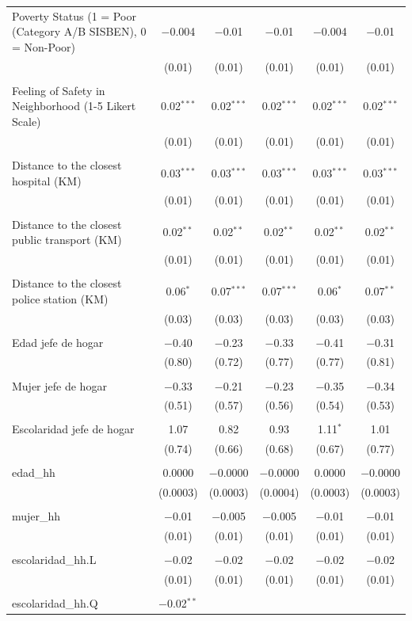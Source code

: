 \begin{table}[H]
\begin{tabularx}{0.9\textwidth}{@{\extracolsep{-7pt}}lccccc}
 Poverty Status (1 = Poor (Category A/B SISBEN), 0 = Non-Poor) & $-$0.004 & $-$0.01 & $-$0.01 & $-$0.004 & $-$0.01 \\    & (0.01) & (0.01) & (0.01) & (0.01) & (0.01) \\    & & & & & \\   Feeling of Safety in Neighborhood (1-5 Likert Scale) & 0.02$^{***}$ & 0.02$^{***}$ & 0.02$^{***}$ & 0.02$^{***}$ & 0.02$^{***}$ \\    & (0.01) & (0.01) & (0.01) & (0.01) & (0.01) \\    & & & & & \\   Distance to the closest hospital (KM) & 0.03$^{***}$ & 0.03$^{***}$ & 0.03$^{***}$ & 0.03$^{***}$ & 0.03$^{***}$ \\    & (0.01) & (0.01) & (0.01) & (0.01) & (0.01) \\    & & & & & \\   Distance to the closest public transport  (KM) & 0.02$^{**}$ & 0.02$^{**}$ & 0.02$^{**}$ & 0.02$^{**}$ & 0.02$^{**}$ \\    & (0.01) & (0.01) & (0.01) & (0.01) & (0.01) \\    & & & & & \\   Distance to the closest police station (KM) & 0.06$^{*}$ & 0.07$^{***}$ & 0.07$^{***}$ & 0.06$^{*}$ & 0.07$^{**}$ \\    & (0.03) & (0.03) & (0.03) & (0.03) & (0.03) \\    & & & & & \\   Edad jefe de hogar & $-$0.40 & $-$0.23 & $-$0.33 & $-$0.41 & $-$0.31 \\    & (0.80) & (0.72) & (0.77) & (0.77) & (0.81) \\    & & & & & \\   Mujer jefe de hogar & $-$0.33 & $-$0.21 & $-$0.23 & $-$0.35 & $-$0.34 \\    & (0.51) & (0.57) & (0.56) & (0.54) & (0.53) \\    & & & & & \\   Escolaridad jefe de hogar & 1.07 & 0.82 & 0.93 & 1.11$^{*}$ & 1.01 \\    & (0.74) & (0.66) & (0.68) & (0.67) & (0.77) \\    & & & & & \\   edad\_hh & 0.0000 & $-$0.0000 & $-$0.0000 & 0.0000 & $-$0.0000 \\    & (0.0003) & (0.0003) & (0.0004) & (0.0003) & (0.0003) \\    & & & & & \\   mujer\_hh & $-$0.01 & $-$0.005 & $-$0.005 & $-$0.01 & $-$0.01 \\    & (0.01) & (0.01) & (0.01) & (0.01) & (0.01) \\    & & & & & \\   escolaridad\_hh.L & $-$0.02 & $-$0.02 & $-$0.02 & $-$0.02 & $-$0.02 \\    & (0.01) & (0.01) & (0.01) & (0.01) & (0.01) \\    & & & & & \\   escolaridad\_hh.Q & $-$0.02$^{**}$ & 
\end{tabularx}
\end{table}
